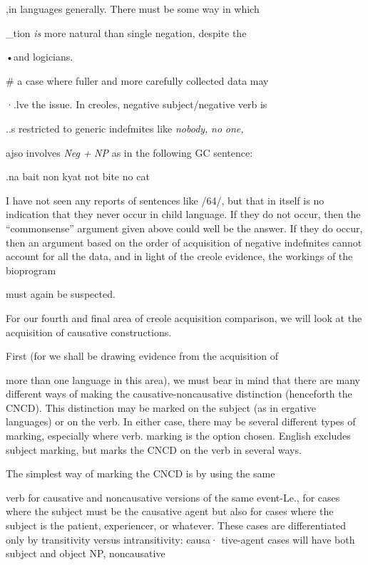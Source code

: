 ,in languages generally. There must be some way in which

\_tion \textit{is} more natural than single negation, despite the

•and logicians.

\# a case where fuller and more carefully collected data may

·.lve the issue. In creoles, negative subject/negative verb is

..s restricted to generic indefmites like \textit{nobody,} \textit{no} \textit{one,}

ajso involves \textit{Neg }\textit{+} \textit{NP }as in the following GC sentence:

.na bait non kyat not bite no cat


I have not seen any reports of sentences like /64/, but that in itself is no indication that they never occur in child language. If they do not occur, then the ``commonsense'' argument given above could well be the answer. If they do occur, then an argument based on the order of acquisition of negative indefmites cannot account for all the data, and in light of the creole evidence, the workings of the bioprogram

must again be suspected.

For our fourth and final area of creole acquisition comparison, we will look at the acquisition of causative constructions.

First (for we shall be drawing evidence from the acquisition of

more than one language in this area), we must bear in mind that there are many different ways of making the causative-noncausative dis\-tinction (henceforth the CNCD). This distinction may be marked on the subject (as in ergative languages) or on the verb. In either case, there may be several different types of marking, especially where verb. marking is the option chosen. English excludes subject marking, but marks the CNCD on the verb in several ways.

The simplest way of marking the CNCD is by using the same

verb for causative and noncausative versions of the same event-Le., for cases where the subject must be the causative agent but also for cases where the subject is the patient, experiencer, or whatever. These cases are differentiated only by transitivity versus intransitivity: causa· tive-agent cases will have both subject and object NP, noncausative

